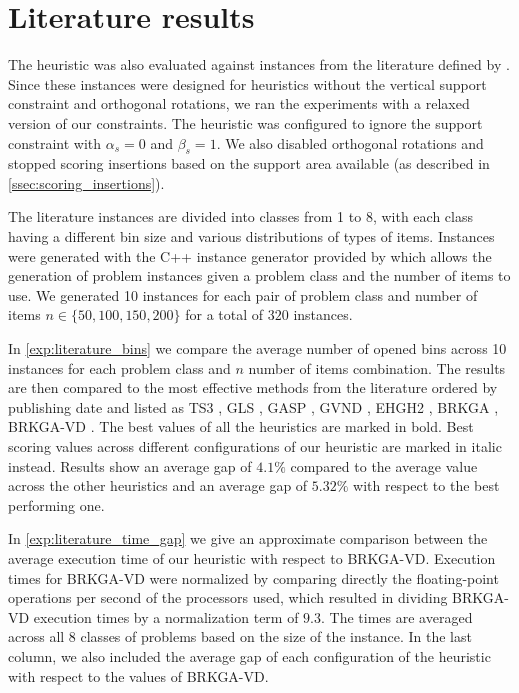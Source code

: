 \section{Literature results}
The heuristic was also evaluated against instances from the literature defined by \citeauthor{martello2000three}.
Since these instances were designed for heuristics without the vertical support constraint and orthogonal rotations, we ran the experiments with a relaxed version of our constraints.
The heuristic was configured to ignore the support constraint with $\alpha_s = 0$ and $\beta_s = 1$. We also disabled orthogonal rotations and stopped scoring insertions based on the support area available (as described in \cref{ssec:scoring_insertions}).

\label{def:class1_instances}
The literature instances are divided into classes from 1 to 8, with each class having a different bin size and various distributions of types of items.
Instances were generated with the C++ instance generator provided by \citeauthor{martello2000three} which allows the generation of problem instances given a problem class and the number of items to use.
We generated 10 instances for each pair of problem class and number of items $n \in \{50, 100, 150, 200\}$ for a total of $320$ instances.

In \cref{exp:literature_bins} we compare the average number of opened bins across 10 instances for each problem class and $n$ number of items combination.
The results are then compared to the most effective methods from the literature ordered by publishing date and listed as TS3 \citep{lodi2002heuristic}, GLS \citep{faroe2003guided}, GASP \citep{crainic2009ts2pack}, GVND \citep{parreno2010hybrid}, EHGH2 \citep{hifi2014hybrid}, BRKGA \citep{gonccalves2013biased}, BRKGA-VD \citep{zudio2018brkga}.
The best values of all the heuristics are marked in bold. Best scoring values across different configurations of our heuristic are marked in italic instead.
Results show an average gap of $4.1\%$ compared to the average value across the other heuristics and an average gap of $5.32\%$ with respect to the best performing one.

In \cref{exp:literature_time_gap} we give an approximate comparison between the average execution time of our heuristic with respect to BRKGA-VD. Execution times for BRKGA-VD were normalized by comparing directly the floating-point operations per second of the processors used, which resulted in dividing BRKGA-VD execution times by a normalization term of $9.3$. 
The times are averaged across all 8 classes of problems based on the size of the instance. In the last column, we also included the average gap of each configuration of the heuristic with respect to the values of BRKGA-VD.
\label{exp:literature_tests}




